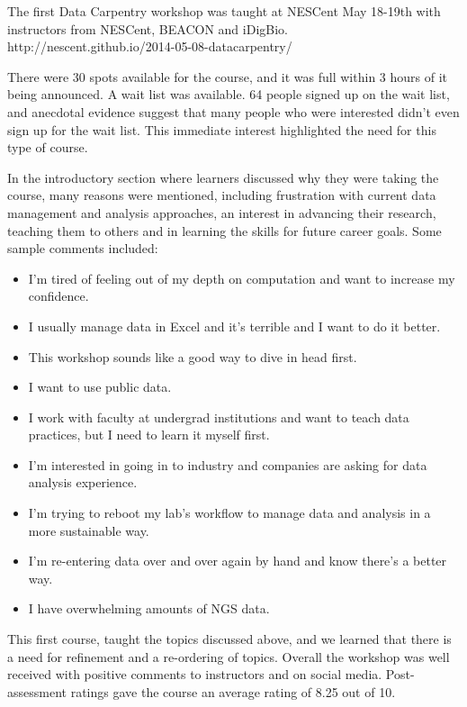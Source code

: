 \documentclass[11pt]{article}
\begin{document}
The first Data Carpentry workshop was taught at NESCent May 18-19th with instructors from NESCent, BEACON and 
iDigBio.
\\http://nescent.github.io/2014-05-08-datacarpentry/

There were 30 spots available for the course, and it was full within 3 hours of it being announced. A wait list was available. 64 people signed up on the wait list, and anecdotal evidence suggest that many people who were interested didn't even sign up for the wait list. This immediate interest highlighted the need for this type of course.

In the introductory section where learners discussed why they were taking the course, many reasons were mentioned, including frustration with current data management and analysis approaches, an interest in advancing their research, teaching them to others and in learning the skills for future career goals. Some sample comments included:

\begin{itemize}
\item I'm tired of feeling out of my depth on computation and want to increase my confidence.
\item I usually manage data in Excel and it's terrible and I want to do it better.
\item This workshop sounds like a good way to dive in head first.
\item I want to use public data.
\item I work with faculty at undergrad institutions and want to teach data practices, but I need to learn it myself first.
\item I'm interested in going in to industry and companies are asking for data analysis experience.
\item I'm trying to reboot my lab's workflow to manage data and analysis in a more sustainable way.
\item I'm re-entering data over and over again by hand and know there's a better way.
\item I have overwhelming amounts of NGS data.
\end{itemize}

This first course, taught the topics discussed above, and we learned that there is a need for refinement and a 
re-ordering of topics. Overall the workshop was well received with positive comments to instructors and on social 
media. Post-assessment ratings gave the course an average rating of 8.25 out of 10.
\end{document}
